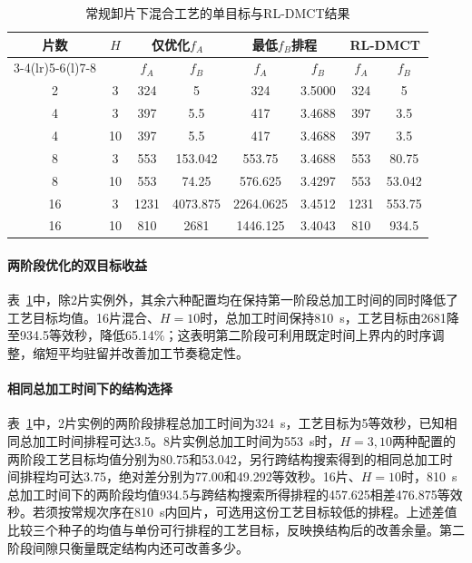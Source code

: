 \documentclass[preprint,12pt,nonatbib]{elsarticle}
\begin{document}
\begin{table}[!htbp]\centering\small
\caption{常规卸片下混合工艺的单目标与RL-DMCT结果}
\label{tab:matched-objectives-cn}
\setlength{\tabcolsep}{3.3pt}
\begin{tabular}{@{}*{8}{c}@{}}\toprule
\multirow{2}{*}{片数} & \multirow{2}{*}{$H$} & \multicolumn{2}{c}{仅优化$f_A$} & \multicolumn{2}{c}{最低$f_B$排程} & \multicolumn{2}{c}{RL-DMCT}\\
\cmidrule(lr){3-4}\cmidrule(lr){5-6}\cmidrule(l){7-8}
 & & $f_A$ & $f_B$ & $f_A$ & $f_B$ & $f_A$ & $f_B$\\\midrule
2 & 3 & 324 & 5 & 324 & 3.5000 & 324 & 5\\
4 & 3 & 397 & 5.5 & 417 & 3.4688 & 397 & 3.5\\
4 & 10 & 397 & 5.5 & 417 & 3.4688 & 397 & 3.5\\
8 & 3 & 553 & 153.042 & 553.75 & 3.4688 & 553 & 80.75\\
8 & 10 & 553 & 74.25 & 576.625 & 3.4297 & 553 & 53.042\\
16 & 3 & 1231 & 4073.875 & 2264.0625 & 3.4512 & 1231 & 553.75\\
16 & 10 & 810 & 2681 & 1446.125 & 3.4043 & 810 & 934.5\\
\bottomrule\end{tabular}\end{table}

\paragraph{两阶段优化的双目标收益}
表~\ref{tab:matched-objectives-cn}中，除2片实例外，其余六种配置均在保持第一阶段总加工时间的同时降低了工艺目标均值。16片混合、$H=10$时，总加工时间保持810~s，工艺目标由2681降至934.5等效秒，降低65.14\%；这表明第二阶段可利用既定时间上界内的时序调整，缩短平均驻留并改善加工节奏稳定性。

\paragraph{相同总加工时间下的结构选择}
表~\ref{tab:matched-objectives-cn}中，2片实例的两阶段排程总加工时间为324~s，工艺目标为5等效秒，已知相同总加工时间排程可达3.5。8片实例总加工时间为553~s时，$H=3,10$两种配置的两阶段工艺目标均值分别为80.75和53.042，另行跨结构搜索得到的相同总加工时间排程均可达3.75，绝对差分别为77.00和49.292等效秒。16片、$H=10$时，810~s总加工时间下的两阶段均值934.5与跨结构搜索所得排程的457.625相差476.875等效秒。若须按常规次序在810~s内回片，可选用这份工艺目标较低的排程。上述差值比较三个种子的均值与单份可行排程的工艺目标，反映换结构后的改善余量。第二阶段间隙只衡量既定结构内还可改善多少。
\end{document}
